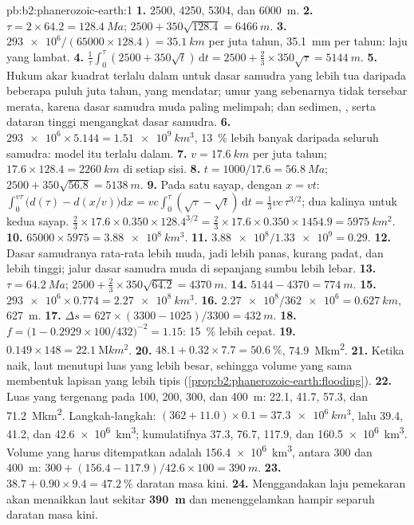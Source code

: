 \begin{solution}{pb:b2:phanerozoic-earth:1}
\textbf{1.} 2500, 4250, 5304, dan \qty{6000}{m}.
\textbf{2.} $\tau = 2 \times 64.2 = \qty{128.4}{Ma}$; $2500 + 350\sqrt{128.4} = \qty{6466}{m}$.
\textbf{3.} $\num{293e6}/(65000 \times 128.4) = \qty{35.1}{km}$ per juta tahun,
\qty{35.1}{mm} per tahun: laju yang lambat.
\textbf{4.} $\frac1\tau\int_0^\tau(2500 + 350\sqrt t)\,\mathrm{d}t = 2500 + \frac23 \times
350\sqrt\tau = \qty{5144}{m}$.
\textbf{5.} Hukum akar kuadrat terlalu dalam untuk dasar samudra yang lebih tua daripada beberapa puluh juta tahun,
yang mendatar; umur yang sebenarnya tidak tersebar merata, karena dasar samudra muda paling melimpah; dan
sedimen, , serta dataran tinggi mengangkat dasar samudra.
\textbf{6.} $\num{293e6} \times 5.144 = \qty{1.51e9}{km^3}$, \qty{13}{\percent} lebih banyak daripada
seluruh samudra: model itu terlalu dalam.
\textbf{7.} $v = \qty{17.6}{km}$ per juta tahun; $17.6 \times 128.4 = \qty{2260}{km}$ di
setiap sisi.
\textbf{8.} $t = 1000/17.6 = \qty{56.8}{Ma}$; $2500 + 350\sqrt{56.8} = \qty{5138}{m}$.
\textbf{9.} Pada satu sayap, dengan $x = vt$: $\int_0^{v\tau}\bigl(d(\tau) - d(x/v)\bigr)\mathrm{d}x
= vc\int_0^\tau(\sqrt\tau - \sqrt t)\,\mathrm{d}t = \frac13 vc\,\tau^{3/2}$; dua kalinya untuk kedua sayap.
$\frac23 \times 17.6 \times 0.350 \times 128.4^{3/2} = \frac23 \times 17.6 \times 0.350 \times
1454.9 = \qty{5975}{km^2}$.
\textbf{10.} $65000 \times 5975 = \qty{3.88e8}{km^3}$.
\textbf{11.} $\num{3.88e8}/\num{1.33e9} = 0.29$.
\textbf{12.} Dasar samudranya rata-rata lebih muda, jadi lebih panas, kurang padat, dan lebih tinggi; jalur dasar samudra
muda di sepanjang sumbu lebih lebar.
\textbf{13.} $\tau = \qty{64.2}{Ma}$; $2500 + \frac23 \times 350\sqrt{64.2} = \qty{4370}{m}$.
\textbf{14.} $5144 - 4370 = \qty{774}{m}$.
\textbf{15.} $\num{293e6} \times 0.774 = \qty{2.27e8}{km^3}$.
\textbf{16.} $\num{2.27e8}/\num{362e6} = \qty{0.627}{km}$, \qty{627}{m}.
\textbf{17.} $\Delta s = 627 \times (3300 - 1025)/3300 = \qty{432}{m}$.
\textbf{18.} $f = \bigl(1 - 0.2929 \times 100/432\bigr)^{-2} = 1.15$: \qty{15}{\percent} lebih cepat.
\textbf{19.} $0.149 \times 148 = \qty{22.1}{\mega km^2}$.
\textbf{20.} $48.1 + 0.32 \times 7.7 = \qty{50.6}{\percent}$, \qty{74.9}{\mega km^2}.
\textbf{21.} Ketika naik, laut menutupi luas yang lebih besar, sehingga volume yang sama membentuk lapisan yang lebih tipis
(\cref{prop:b2:phanerozoic-earth:flooding}).
\textbf{22.} Luas yang tergenang pada 100, 200, 300, dan \qty{400}{m}: 22.1, 41.7, 57.3, dan
\qty{71.2}{\mega km^2}. Langkah-langkah: $(362 + 11.0) \times 0.1 = \qty{37.3e6}{km^3}$, lalu 39.4, 41.2,
dan \qty{42.6e6}{km^3}; kumulatifnya 37.3, 76.7, 117.9, dan \qty{160.5e6}{km^3}. Volume yang harus ditempatkan
adalah \qty{156.4e6}{km^3}, antara 300 dan \qty{400}{m}: $300 + (156.4 - 117.9)/42.6 \times 100
= \qty{390}{m}$.
\textbf{23.} $38.7 + 0.90 \times 9.4 = \qty{47.2}{\percent}$ daratan masa kini.
\textbf{24.} Menggandakan laju pemekaran akan menaikkan laut sekitar \textbf{\qty{390}{m}} dan
menenggelamkan hampir separuh daratan masa kini.
\end{solution}
